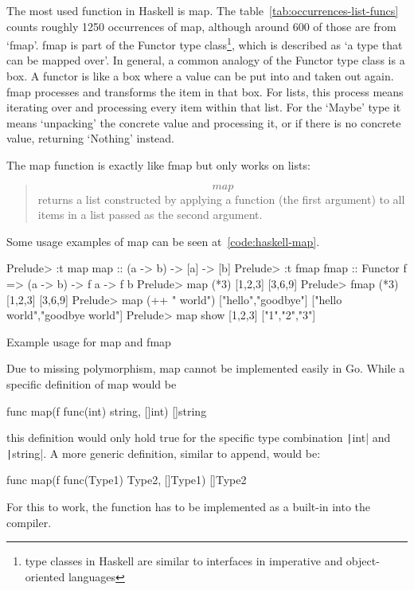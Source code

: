 The most used function in Haskell is map. The table~\ref{tab:occurrences-list-funcs}
counts roughly 1250 occurrences of map, although around 600 of those are from `fmap'.
fmap is part of the Functor type class\footnote{type classes
    in Haskell are similar to interfaces in imperative and object-oriented
languages}, which is described as `a type that can be mapped over'\autocite{functor-wiki}.
In general, a common analogy of the Functor type class is a box. A functor is like a box
where a value can be put into and taken out again. fmap processes and transforms the item
in that box. For lists, this process means iterating over and processing every item within that list.
For the `Maybe' type it means `unpacking' the concrete value and processing it, or if there is
no concrete value, returning `Nothing' instead.

The map function is exactly like fmap but only works on lists:

\begin{quote}
    \[map\] returns a list constructed by applying a function (the first argument) to all
    items in a list passed as the second argument\autocite{haskell-map}.
\end{quote}

Some usage examples of map can be seen at~\ref{code:haskell-map}.

\begin{listing}
    \begin{haskellcode}
Prelude> :t map
map :: (a -> b) -> [a] -> [b]
Prelude> :t fmap
fmap :: Functor f => (a -> b) -> f a -> f b
Prelude> map (*3) [1,2,3]
[3,6,9]
Prelude> fmap (*3) [1,2,3]
[3,6,9]
Prelude> map (++ " world") ["hello","goodbye"]
["hello world","goodbye world"]
Prelude> map show [1,2,3]
["1","2","3"]
    \end{haskellcode}
    \caption{Example usage for map and fmap}\label{code:haskell-map}
\end{listing}
Due to missing polymorphism, map cannot be implemented easily in Go. While
a specific definition of map would be
\begin{gocode}
func map(f func(int) string, []int) []string
\end{gocode}
this definition would only hold true for the specific type combination \texttt|int|
and \texttt|string|. A more generic definition, similar to append,
would be:
\begin{gocode}
func map(f func(Type1) Type2, []Type1) []Type2
\end{gocode}
For this to work, the function has to be implemented as a built-in into the compiler.

